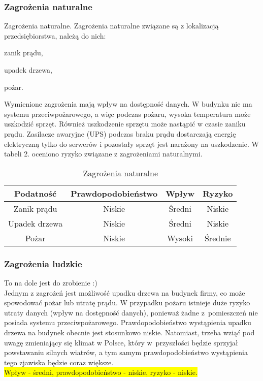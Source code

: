 \subsubsection{Zagrożenia naturalne} 
Zagrożenia naturalne.
Zagrożenia naturalne związane są z lokalizacją przedsiębiorstwa, należą do nich:
	\begin{itemize*}
		\item zanik prądu,
		\item upadek drzewa,
		\item pożar.
	\end{itemize*}
Wymienione zagrożenia mają wpływ na dostępność danych. W budynku nie ma systemu przeciwpożarowego, a więc podczas pożaru, wysoka temperatura może uszkodzić sprzęt. Również uszkodzenie sprzętu może nastąpić w czasie zaniku prądu. Zasilacze awaryjne (UPS) podczas braku prądu dostarczają energię elektryczną tylko do serwerów i pozostały sprzęt jest narażony na uszkodzenie. W tabeli 2. oceniono ryzyko związane z zagrożeniami naturalnymi.
\begin{table}[!ht]
	\centering
	\caption{Zagrożenia naturalne}
	\label{zagrożeniaNaturalne}
	\begin{tabular}{|c|c|c|c|}
		\hline
		\textbf{Podatność} & \textbf{Prawdopodobieństwo} & \textbf{Wpływ} & \textbf{Ryzyko} \\ \hline
		Zanik prądu        & Niskie                      & Średni         & Niskie          \\ \hline
		Upadek drzewa      & Niskie                      & Średni         & Niskie          \\ \hline
		Pożar              & Niskie                      & Wysoki        & Średnie         \\ \hline
	\end{tabular}
\end{table}

\subsubsection{Zagrożenia ludzkie}
To na dole jest do zrobienie :)  \\
Jednym z zagrożeń jest możliwość upadku drzewa na budynek firmy, co może spowodować pożar lub utratę prądu. W przypadku pożaru istnieje duże ryzyko utraty danych (wpływ na dostępność danych), ponieważ żadne z~pomieszczeń nie posiada systemu przeciwpożarowego.  Prawdopodobieństwo wystąpienia upadku drzewa na budynek obecnie jest stosunkowo niskie. Natomiast, trzeba wziąć pod uwagę zmieniający się klimat w Polsce, który w~przyszłości będzie sprzyjał powstawaniu silnych wiatrów, a tym samym prawdopodobieństwo wystąpienia tego zjawiska będzie coraz większe. \\ \colorbox{yellow}{Wpływ - średni, prawdopodobieństwo - niskie, ryzyko - niskie.}

